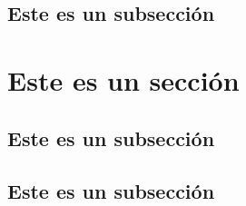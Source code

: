 \documentclass[11pt,oneside]{book}
\begin{document}
\subsection{Este es un subsección}
\lipsum[1-2]

\section{Este es un sección}
\subsection{Este es un subsección}
\lipsum[1-1]
\subsection{Este es un subsección}
\lipsum[1-2]
\end{document}
